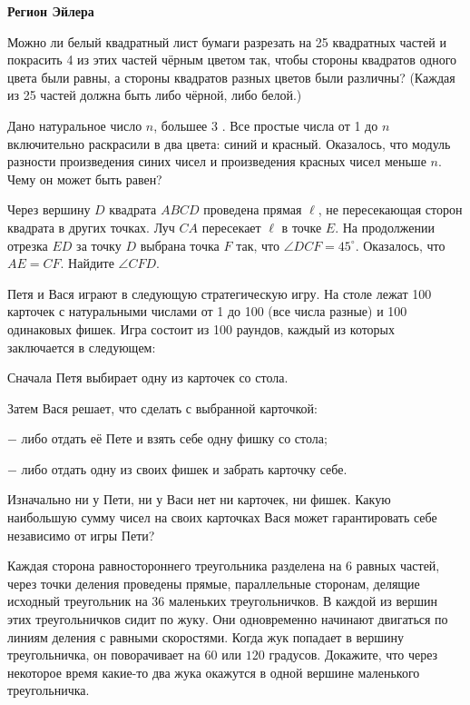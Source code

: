 \centerline{\bf \Huge Регион Эйлера}

\begin{flushright}
        \scriptsize{}
\end{flushright}

Можно ли белый квадратный лист бумаги разрезать на 25 квадратных частей и покрасить 4 из этих частей чёрным цветом так, чтобы стороны квадратов одного цвета были равны, а стороны квадратов разных цветов были различны? (Каждая из 25 частей должна быть либо чёрной, либо белой.)

Дано натуральное число $n$, большее 3 . Все простые числа от 1 до $n$ включительно раскрасили в два цвета: синий и красный. Оказалось, что модуль разности произведения синих чисел и произведения красных чисел меньше $n$. Чему он может быть равен?

Через вершину $D$ квадрата $A B C D$ проведена прямая $\ell$, не пересекающая сторон квадрата в других точках. Луч $C A$ пересекает $\ell$ в точке $E$. На продолжении отрезка $E D$ за точку $D$ выбрана точка $F$ так, что $\angle D C F=45^{\circ}$. Оказалось, что $A E=C F$. Найдите $\angle C F D$.

Петя и Вася играют в следующую стратегическую игру. На столе лежат 100 карточек с натуральными числами от 1 до 100 (все числа разные) и 100 одинаковых фишек. Игра состоит из 100 раундов, каждый из которых заключается в следующем:

Сначала Петя выбирает одну из карточек со стола.

Затем Вася решает, что сделать с выбранной карточкой:

\quad
$-$ либо отдать её Пете и взять себе одну фишку со стола;

\quad
$-$ либо отдать одну из своих фишек и забрать карточку себе.

Изначально ни у Пети, ни у Васи нет ни карточек, ни фишек. Какую наибольшую сумму чисел на своих карточках Вася может гарантировать себе независимо от игры Пети?

Каждая сторона равностороннего треугольника разделена на 6 равных частей, через точки деления проведены прямые, параллельные сторонам, делящие исходный треугольник на 36 маленьких треугольничков. В каждой из вершин этих треугольничков сидит по жуку. Они одновременно начинают двигаться по линиям деления с равными скоростями. Когда жук попадает в вершину треугольничка, он поворачивает на $60$ или $120$ градусов. Докажите, что через некоторое время какие-то два жука окажутся в одной вершине маленького треугольничка.